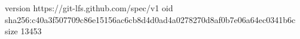 version https://git-lfs.github.com/spec/v1
oid sha256:c40a3f507709c86e15156ac6cb8d4d0ad4a0278270d8af0b7e06a64ec0341b6c
size 13453
